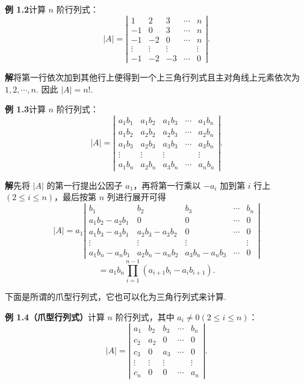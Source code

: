 \documentclass[UTF8,12pt,a4paper,fontset=fandol]{ctexart}
\begin{document}
\noindent\textbf{例 1.2}\quad 计算 $n$ 阶行列式：
\[
|A|=\left|\begin{array}{ccccc}
1 & 2 & 3 & \cdots & n\\
-1 & 0 & 3 & \cdots & n\\
-1 & -2 & 0 & \cdots & n\\
\vdots & \vdots & \vdots &        & \vdots\\
-1 & -2 & -3 & \cdots & 0
\end{array}\right|.
\]

\noindent\textbf{解}\quad 将第一行依次加到其他行上便得到一个上三角行列式且主对角线上元素依次为 $1,2,\cdots,n$. 因此 $|A|=n!$.

\noindent\textbf{例 1.3}\quad 计算 $n$ 阶行列式：
\[
|A|=\left|\begin{array}{ccccc}
a_1b_1 & a_1b_2 & a_1b_3 & \cdots & a_1b_n\\
a_1b_2 & a_2b_2 & a_2b_3 & \cdots & a_2b_n\\
a_1b_3 & a_2b_3 & a_3b_3 & \cdots & a_3b_n\\
\vdots & \vdots & \vdots &        & \vdots\\
a_1b_n & a_2b_n & a_3b_n & \cdots & a_nb_n
\end{array}\right|.
\]

\noindent\textbf{解}\quad 先将 $|A|$ 的第一行提出公因子 $a_1$，再将第一行乘以 $-a_i$ 加到第 $i$ 行上 $(2\le i\le n)$，最后按第 $n$ 列进行展开可得
\[
|A|=
a_1
\left|\begin{array}{ccccc}
b_1 & b_2 & b_3 & \cdots & b_n\\
a_1b_2-a_2b_1 & 0 & 0 & \cdots & 0\\
a_1b_3-a_3b_1 & a_2b_3-a_3b_2 & 0 & \cdots & 0\\
\vdots & \vdots & \vdots &        & \vdots\\
a_1b_n-a_nb_1 & a_2b_n-a_nb_2 & a_3b_n-a_nb_3 & \cdots & 0
\end{array}\right|
\]
\[
=a_1b_n\prod_{i=1}^{n-1}(a_{i+1}b_i-a_ib_{i+1}).
\]

下面是所谓的爪型行列式，它也可以化为三角行列式来计算.

\noindent\textbf{例 1.4（爪型行列式）}\quad 计算 $n$ 阶行列式，其中 $a_i\ne0(2\le i\le n)$：
\[
|A|=\left|\begin{array}{ccccc}
a_1 & b_2 & b_3 & \cdots & b_n\\
c_2 & a_2 & 0 & \cdots & 0\\
c_3 & 0 & a_3 & \cdots & 0\\
\vdots & \vdots & \vdots &        & \vdots\\
c_n & 0 & 0 & \cdots & a_n
\end{array}\right|.
\]
\end{document}
